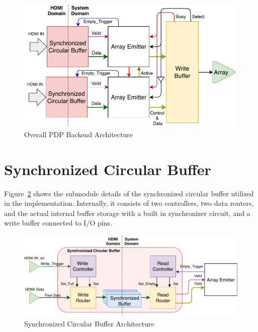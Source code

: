     \begin{figure}
        \centering
        \includegraphics[width=1.0\textwidth]{fig/pdp_overall_arch.pdf}
        \caption{Overall PDP Backend Architecture}
        \label{fig:overall_arch}
    \end{figure}

\section{Synchronized Circular Buffer}

    Figure~\ref{fig:scb_arch} shows the submodule details of the synchronized circular buffer utilized in the implementation. Internally, it consists of two controllers, two data routers, and the actual internal buffer storage with a built in synchronizer circuit, and a write buffer connected to I/O pins.

    \begin{figure}
        \centering
        \includegraphics[width=1.0\textwidth]{fig/pdp_scb_arch.pdf}
        \caption{Synchronized Circular Buffer Architecture}
        \label{fig:scb_arch}
    \end{figure}

